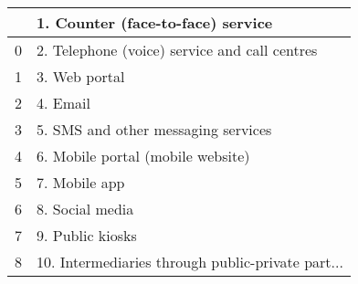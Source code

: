 \begin{tabular}{ll}
\toprule
{} &                  1. Counter (face-to-face) service \\
\midrule
0 &      2. Telephone (voice) service and call centres \\
1 &                                      3. Web portal \\
2 &                                           4. Email \\
3 &                5. SMS and other messaging services \\
4 &                  6. Mobile portal (mobile website) \\
5 &                                      7. Mobile app \\
6 &                                    8. Social media \\
7 &                                   9. Public kiosks \\
8 &  10. Intermediaries through public-private part... \\
\bottomrule
\end{tabular}
